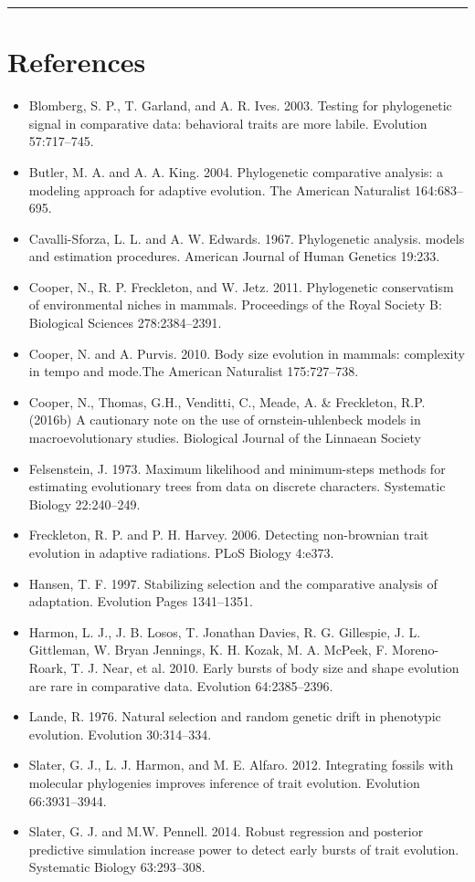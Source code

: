 \documentclass[]{book}
\providecommand{\tightlist}{%
  \setlength{\itemsep}{0pt}\setlength{\parskip}{0pt}}
\begin{document}
\begin{center}\rule{0.5\linewidth}{\linethickness}\end{center}

\section{References}\label{references-2}

\begin{itemize}
\tightlist
\item
  Blomberg, S. P., T. Garland, and A. R. Ives. 2003. Testing for
  phylogenetic signal in comparative data: behavioral traits are more
  labile. Evolution 57:717--745.
\item
  Butler, M. A. and A. A. King. 2004. Phylogenetic comparative analysis:
  a modeling approach for adaptive evolution. The American Naturalist
  164:683--695.
\item
  Cavalli-Sforza, L. L. and A. W. Edwards. 1967. Phylogenetic analysis.
  models and estimation procedures. American Journal of Human Genetics
  19:233.
\item
  Cooper, N., R. P. Freckleton, and W. Jetz. 2011. Phylogenetic
  conservatism of environmental niches in mammals. Proceedings of the
  Royal Society B: Biological Sciences 278:2384--2391.
\item
  Cooper, N. and A. Purvis. 2010. Body size evolution in mammals:
  complexity in tempo and mode.The American Naturalist 175:727--738.
\item
  Cooper, N., Thomas, G.H., Venditti, C., Meade, A. \& Freckleton, R.P.
  (2016b) A cautionary note on the use of ornstein-uhlenbeck models in
  macroevolutionary studies. Biological Journal of the Linnaean Society
\item
  Felsenstein, J. 1973. Maximum likelihood and minimum-steps methods for
  estimating evolutionary trees from data on discrete characters.
  Systematic Biology 22:240--249.
\item
  Freckleton, R. P. and P. H. Harvey. 2006. Detecting non-brownian trait
  evolution in adaptive radiations. PLoS Biology 4:e373.
\item
  Hansen, T. F. 1997. Stabilizing selection and the comparative analysis
  of adaptation. Evolution Pages 1341--1351.
\item
  Harmon, L. J., J. B. Losos, T. Jonathan Davies, R. G. Gillespie, J. L.
  Gittleman, W. Bryan Jennings, K. H. Kozak, M. A. McPeek, F.
  Moreno-Roark, T. J. Near, et al. 2010. Early bursts of body size and
  shape evolution are rare in comparative data. Evolution 64:2385--2396.
\item
  Lande, R. 1976. Natural selection and random genetic drift in
  phenotypic evolution. Evolution 30:314--334.
\item
  Slater, G. J., L. J. Harmon, and M. E. Alfaro. 2012. Integrating
  fossils with molecular phylogenies improves inference of trait
  evolution. Evolution 66:3931--3944.
\item
  Slater, G. J. and M.W. Pennell. 2014. Robust regression and posterior
  predictive simulation increase power to detect early bursts of trait
  evolution. Systematic Biology 63:293--308.
\end{itemize}
\end{document}
